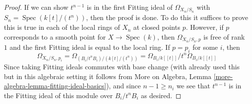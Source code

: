 \documentclass[10pt,a4paper]{amsart}
\theoremstyle{plain}
\theoremstyle{definition}
\theoremstyle{remark}
\numberwithin{equation}{subsection}
\def\Spec{\mathop{\mathrm{Spec}}}
\begin{document}
\begin{proof}
If we can show $t^{n - 1}$ is in the first Fitting ideal of
$\Omega_{X_n/S_n}$ with $S_n = \Spec(k[t]/(t^n))$, then the proof is done.
To do this it suffices to prove this is true in each of
the local rings of $X_n$ at closed points $p$.
However, if $p$ corresponds to a smooth point for $X \to \Spec(k)$,
then $\Omega_{X_n/S_n, p}$ is free of rank $1$ and the first Fitting
ideal is equal to the local ring. If $p = p_i$ for some $i$, then
$$
\Omega_{X_n/S_n, p_i} =
\Omega_{(B_i/t^nB_i)/(k[t]/(t^n))} =
\Omega_{B_i/k[[t]]}/t^n\Omega_{B_i/k[[t]]}
$$
Since taking Fitting ideals commutes with base change
(with already used this but in this algebraic setting
it follows from More on Algebra, Lemma
\ref{more-algebra-lemma-fitting-ideal-basics}),
and since $n - 1 \geq n_i$ we see that $t^{n - 1}$ is
in the Fitting ideal of this module over $B_i/t^nB_i$ as desired.
\end{proof}
\end{document}
